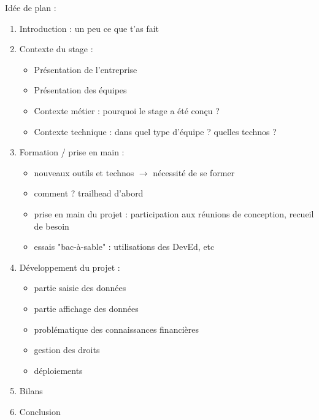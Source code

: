 \documentclass[12pt, a4paper]{article}
\title{\vspace{-5cm}}
\date{}
\begin{document}
\maketitle

Idée de plan : 

\begin{enumerate}
    \item Introduction : un peu ce que t'as fait
    \item Contexte du stage : 
    \begin{itemize}
        \item Présentation de l'entreprise
        \item Présentation des équipes
        \item Contexte métier : pourquoi le stage a été conçu ?
        \item Contexte technique : dans quel type d'équipe ? quelles technos ?
    \end{itemize}
    \item Formation / prise en main :
\begin{itemize}
    \item nouveaux outils et technos $\to$ nécessité de se former
    \item comment ? trailhead d'abord
    \item prise en main du projet : participation aux réunions de conception, recueil de besoin
    \item essais "bac-à-sable" : utilisations des DevEd, etc
\end{itemize}
\item Développement du projet :
\begin{itemize}
    \item partie saisie des données
    \item partie affichage des données
    \item problématique des connaissances financières
    \item gestion des droits
    \item déploiements
\end{itemize}
\item Bilans
\item Conclusion
\end{enumerate}
\end{document}
